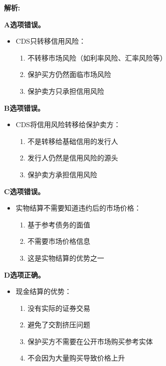 \documentclass{article}
\newenvironment{explanation}
{\textbf{解析:}\par}
{\par}
\begin{document}
\begin{explanation}
    \textbf{A选项错误。}
    \begin{itemize}
        \item CDS只转移信用风险：
        \begin{enumerate}
            \item 不转移市场风险（如利率风险、汇率风险等）
            \item 保护买方仍然面临市场风险
            \item 保护卖方只承担信用风险
        \end{enumerate}
    \end{itemize}
    
    \textbf{B选项错误。}
    \begin{itemize}
        \item CDS将信用风险转移给保护卖方：
        \begin{enumerate}
            \item 不是转移给基础信用的发行人
            \item 发行人仍然是信用风险的源头
            \item 保护卖方承担信用风险
        \end{enumerate}
    \end{itemize}
    
    \textbf{C选项错误。}
    \begin{itemize}
        \item 实物结算不需要知道违约后的市场价格：
        \begin{enumerate}
            \item 基于参考债务的面值
            \item 不需要市场价格信息
            \item 这是实物结算的优势之一
        \end{enumerate}
    \end{itemize}
    
    \textbf{D选项正确。}
    \begin{itemize}
        \item 现金结算的优势：
        \begin{enumerate}
            \item 没有实际的证券交易
            \item 避免了交割挤压问题
            \item 保护买方不需要在公开市场购买参考实体
            \item 不会因为大量购买导致价格上升
        \end{enumerate}
    \end{itemize}
\end{explanation}
\end{document}
